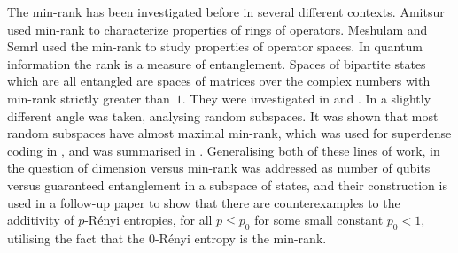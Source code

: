 \documentclass{daj}
\begin{document}
The min-rank has been investigated before in several different contexts. Amitsur~\cite{amitsur1965generalized} used min-rank to characterize properties of rings of operators. %
Meshulam and Semrl \cite{MR2073900} used the min-rank to study properties of operator spaces. %
%
%
%
In quantum information the rank is a measure of entanglement. Spaces of bipartite states which are all entangled are spaces of matrices over the complex numbers with min-rank strictly greater than~$1$. They were investigated in \cite{wallach2002unentangled} and \cite{parthasarathey2004maxdim}. In \cite{hayden2006generic} a slightly different angle was taken, analysing random subspaces. It was shown that most random subspaces have almost maximal min-rank, which was used for superdense coding in \cite{anura2006superdense}, and was summarised in \cite{hayden2004random}.
 Generalising both of these lines of work,
in \cite{cubitt2008subspacesbounded} the question of dimension versus min-rank was addressed as number of qubits versus guaranteed entanglement in a subspace of states, and their construction is used in a follow-up paper \cite{cubitt2008counterexamples} to show that 
there are counterexamples to the additivity of $p$-R{\'e}nyi entropies, for all $p\leq p_0$ for some small constant $p_0<1$, utilising the fact that the $0$-R{\'e}nyi entropy is the min-rank. 


%

%
%

%
%
%
%
%
%
%
%

%

%
%
%
%
%

%
%
%
%

%
%
%

%
%
%
%

%

%
%
%
%
%

%

%


%
%

%
%
%
%

%
%


%
%
%

%

%
%

%
%
%

%
%
%
%

%
%
%

%

%
\end{document}
